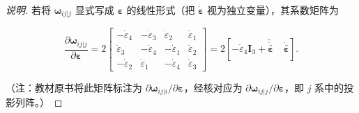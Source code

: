 \begin{proof}[说明]
若将 $\boldsymbol{\omega}_{ij|j}$ 显式写成 $\boldsymbol{\varepsilon}$ 的线性形式（把 $\dot{\boldsymbol{\varepsilon}}$ 视为独立变量），其系数矩阵为

\[
\frac{\partial\boldsymbol{\omega}_{ij|j}}{\partial\boldsymbol{\varepsilon}}
=2
\begin{bmatrix}
-\dot{\varepsilon}_4 & -\dot{\varepsilon}_3 & \dot{\varepsilon}_2 & \dot{\varepsilon}_1\\
\dot{\varepsilon}_3 & -\dot{\varepsilon}_4 & -\dot{\varepsilon}_1 & \dot{\varepsilon}_2\\
-\dot{\varepsilon}_2 & \dot{\varepsilon}_1 & -\dot{\varepsilon}_4 & \dot{\varepsilon}_3
\end{bmatrix}
=2\left[-\dot{\varepsilon}_4\boldsymbol{I}_3+\tilde{\dot{\bar{\boldsymbol{\varepsilon}}}}\quad \dot{\bar{\boldsymbol{\varepsilon}}}\right].
\]

（注：教材原书将此矩阵标注为 $\partial\boldsymbol{\omega}_{ij|i}/\partial\boldsymbol{\varepsilon}$，经核对应为 $\partial\boldsymbol{\omega}_{ij|j}/\partial\boldsymbol{\varepsilon}$，即 $j$ 系中的投影列阵。）
\end{proof}
